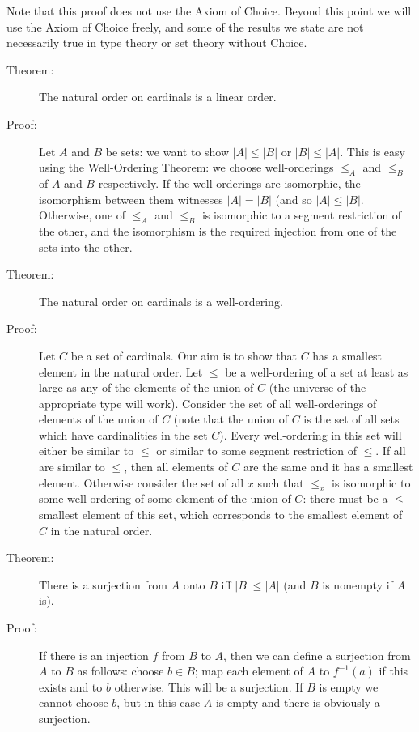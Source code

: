\documentclass[12pt]{book}
\begin{document}
Note that this proof does not use the Axiom of Choice.  Beyond this
point we will use the Axiom of Choice freely, and some of the results
we state are not necessarily true in type theory or set theory without
Choice.

\newpage

\begin{description}

\item[Theorem:]  The natural order on cardinals is a linear order.

\item[Proof:] Let $A$ and $B$ be sets: we want to show $|A| \leq |B|$
or $|B| \leq |A|$.  This is easy using the Well-Ordering Theorem: we
choose well-orderings $\leq_A$ and $\leq_B$ of $A$ and $B$
respectively.  If the well-orderings are isomorphic, the isomorphism
between them witnesses $|A|=|B|$ (and so $|A| \leq |B|$.  Otherwise,
one of $\leq_A$ and $\leq_B$ is isomorphic to a segment restriction of
the other, and the isomorphism is the required injection from one of
the sets into the other.

\item[Theorem:]  The natural order on cardinals is a well-ordering.

\item[Proof:] Let $C$ be a set of cardinals.  Our aim is to show that
$C$ has a smallest element in the natural order.  Let $\leq$ be a
well-ordering of a set at least as large as any of the elements of the
union of $C$ (the universe of the appropriate type will work).
Consider the set of all well-orderings of elements of the union of $C$
(note that the union of $C$ is the set of all sets which have
cardinalities in the set $C$).  Every well-ordering in this set will
either be similar to $\leq$ or similar to some segment restriction of
$\leq$.  If all are similar to $\leq$, then all elements of $C$ are
the same and it has a smallest element.  Otherwise consider the set of
all $x$ such that $\leq_x$ is isomorphic to some well-ordering of some
element of the union of $C$: there must be a $\leq$-smallest element
of this set, which corresponds to the smallest element of $C$ in the
natural order.

\item[Theorem:]  There is a surjection from $A$ onto $B$ iff
$|B| \leq |A|$ (and $B$ is nonempty if $A$ is).

\item[Proof:] If there is an injection $f$ from $B$ to $A$, then we
can define a surjection from $A$ to $B$ as follows: choose $b \in B$;
map each element of $A$ to $f^{-1}(a)$ if this exists and to $b$
otherwise.  This will be a surjection.  If $B$ is empty we cannot
choose $b$, but in this case $A$ is empty and there is obviously a
surjection.


\end{description}
\end{document}
